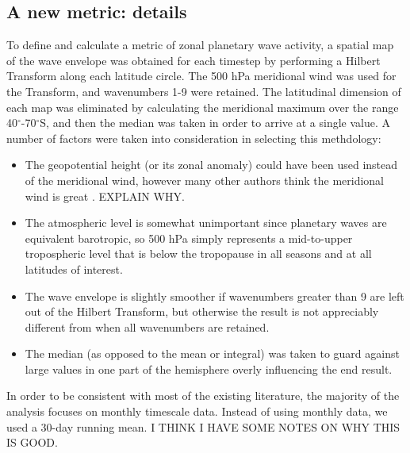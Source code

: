 \subsection{A new metric: details}

To define and calculate a metric of zonal planetary wave activity, a spatial map of the wave envelope was obtained for each timestep by performing a Hilbert Transform along each latitude circle. The 500 hPa meridional wind was used for the Transform, and wavenumbers 1-9 were retained. The latitudinal dimension of each map was eliminated by calculating the meridional maximum over the range 40$^{\circ}$-70$^{\circ}$S, and then the median was taken in order to arrive at a single value. A number of factors were taken into consideration in selecting this methdology:
\begin{itemize}
\item The geopotential height (or its zonal anomaly) could have been used instead of the meridional wind, however many other authors think the meridional wind is great \citep[e.g.]{Hope2014}. EXPLAIN WHY.
\item The atmospheric level is somewhat unimportant since planetary waves are equivalent barotropic, so 500 hPa simply represents a mid-to-upper tropospheric level that is below the tropopause in all seasons and at all latitudes of interest.
\item The wave envelope is slightly smoother if wavenumbers greater than 9 are left out of the Hilbert Transform, but otherwise the result is not appreciably different from when all wavenumbers are retained.  
\item The median (as opposed to the mean or integral) was taken to guard against large values in one part of the hemisphere overly influencing the end result.
\end{itemize}

In order to be consistent with most of the existing literature, the majority of the analysis focuses on monthly timescale data. Instead of using monthly data, we used a 30-day running mean. I THINK I HAVE SOME NOTES ON WHY THIS IS GOOD.

